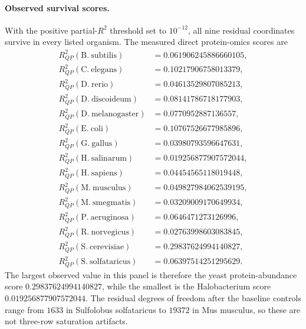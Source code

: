 \paragraph{Observed survival scores.}
With the positive partial-$R^2$ threshold set to $10^{-12}$, all nine residual coordinates survive in every listed organism.  The measured direct protein-omics scores are
$$
\begin{aligned}
R^2_{QP}(\mathrm{B.\ subtilis}) &= 0.061906245886660105,\\
R^2_{QP}(\mathrm{C.\ elegans}) &= 0.10217906758013379,\\
R^2_{QP}(\mathrm{D.\ rerio}) &= 0.04613529807085213,\\
R^2_{QP}(\mathrm{D.\ discoideum}) &= 0.08141786718177903,\\
R^2_{QP}(\mathrm{D.\ melanogaster}) &= 0.0770952887136557,\\
R^2_{QP}(\mathrm{E.\ coli}) &= 0.10767526677985896,\\
R^2_{QP}(\mathrm{G.\ gallus}) &= 0.03980793596647631,\\
R^2_{QP}(\mathrm{H.\ salinarum}) &= 0.019256877907572044,\\
R^2_{QP}(\mathrm{H.\ sapiens}) &= 0.04454565118019448,\\
R^2_{QP}(\mathrm{M.\ musculus}) &= 0.049827984062539195,\\
R^2_{QP}(\mathrm{M.\ smegmatis}) &= 0.03209009170649934,\\
R^2_{QP}(\mathrm{P.\ aeruginosa}) &= 0.0646471273126996,\\
R^2_{QP}(\mathrm{R.\ norvegicus}) &= 0.02763998603083845,\\
R^2_{QP}(\mathrm{S.\ cerevisiae}) &= 0.29837624994140827,\\
R^2_{QP}(\mathrm{S.\ solfataricus}) &= 0.06397514251295629.
\end{aligned}
$$
The largest observed value in this panel is therefore the yeast protein-abundance score $0.29837624994140827$, while the smallest is the Halobacterium score $0.019256877907572044$.  The residual degrees of freedom after the baseline controls range from $1633$ in Sulfolobus solfataricus to $19372$ in Mus musculus, so these are not three-row saturation artifacts.

